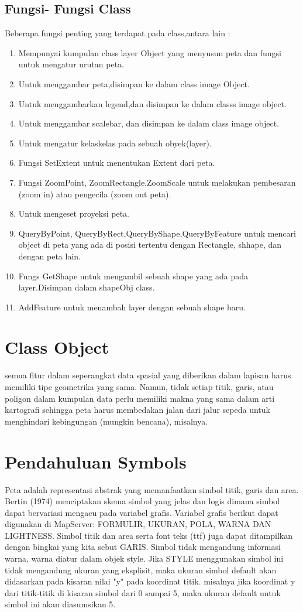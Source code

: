 \subsection {Fungsi- Fungsi Class}
Beberapa fungsi penting yang terdapat pada class,antara lain :
\begin{enumerate}
\item Mempunyai kumpulan class layer Object yang menyusun peta dan fungsi untuk mengatur urutan peta.
\item Untuk menggambar peta,disimpan ke dalam class image Object.
\item Untuk menggambarkan legend,dan disimpan ke dalam classs image object.
\item Untuk menggambar scalebar, dan disimpan ke dalam class image object.
\item Untuk mengatur kelaskelas pada sebuah obyek(layer).
\item Fungsi SetExtent untuk menentukan Extent dari peta.
\item Fungsi ZoomPoint, ZoomRectangle,ZoomScale untuk melakukan pembesaran (zoom in) atau pengecila (zoom out peta).
\item Untuk mengeset proyeksi peta.
\item QueryByPoint, QueryByRect,QueryByShape,QueryByFeature untuk mencari object di peta yang ada di posisi tertentu dengan Rectangle, shhape, dan dengan peta lain.
\item Fungs GetShape untuk mengambil sebuah shape yang ada pada layer.Disimpan dalam shapeObj class.
\item AddFeature untuk menambah layer dengan sebuah shape baru.
\end{enumerate}

\section{Class Object}
    semua fitur dalam seperangkat data spasial yang diberikan dalam lapisan harus memiliki tipe geometrika yang sama. Namun, tidak setiap titik, garis, atau poligon dalam kumpulan data perlu memiliki makna yang sama dalam arti kartografi sehingga peta harus membedakan jalan dari jalur sepeda untuk menghindari kebingungan (mungkin bencana), misalnya.

\section {Pendahuluan Symbols}
    Peta adalah representasi abstrak yang memanfaatkan simbol titik, garis dan area. Bertin (1974) menciptakan skema simbol yang jelas dan logis dimana simbol dapat bervariasi mengacu pada variabel grafis. Variabel grafis berikut dapat digunakan di MapServer: FORMULIR, UKURAN, POLA, WARNA DAN LIGHTNESS. Simbol titik dan area serta font teks (ttf) juga dapat ditampilkan dengan bingkai yang kita sebut GARIS. Simbol tidak mengandung informasi warna, warna diatur dalam objek style. Jika STYLE menggunakan simbol ini tidak mengandung ukuran yang eksplisit, maka ukuran simbol default akan didasarkan pada kisaran nilai "y" pada koordinat titik. misalnya jika koordinat y dari titik-titik di kisaran simbol dari 0 sampai 5, maka ukuran default untuk simbol ini akan diasumsikan 5.
    
